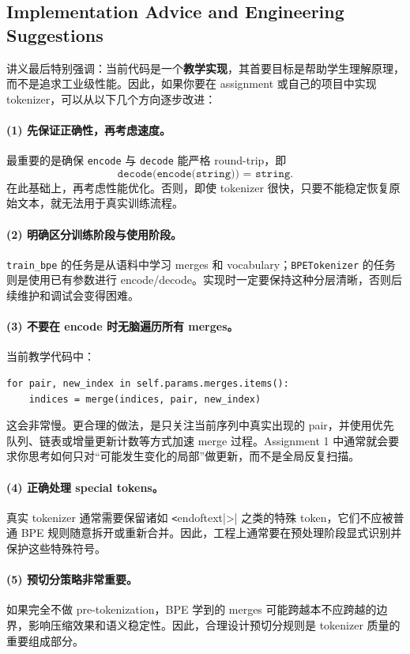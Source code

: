 \documentclass[a4paper,UTF8]{article}
\numberwithin{equation}{section}
\begin{document}
\subsection{Implementation Advice and Engineering Suggestions}

讲义最后特别强调：当前代码是一个\textbf{教学实现}，其首要目标是帮助学生理解原理，而不是追求工业级性能。因此，如果你要在 assignment 或自己的项目中实现 tokenizer，可以从以下几个方向逐步改进：

\paragraph{(1) 先保证正确性，再考虑速度。}
最重要的是确保 \verb|encode| 与 \verb|decode| 能严格 round-trip，即
\[
\texttt{decode(encode(string)) = string}.
\]
在此基础上，再考虑性能优化。否则，即使 tokenizer 很快，只要不能稳定恢复原始文本，就无法用于真实训练流程。

\paragraph{(2) 明确区分训练阶段与使用阶段。}
\verb|train_bpe| 的任务是从语料中学习 merges 和 vocabulary；\verb|BPETokenizer| 的任务则是使用已有参数进行 encode/decode。实现时一定要保持这种分层清晰，否则后续维护和调试会变得困难。

\paragraph{(3) 不要在 encode 时无脑遍历所有 merges。}
当前教学代码中：

\begin{verbatim}
for pair, new_index in self.params.merges.items():
    indices = merge(indices, pair, new_index)
\end{verbatim}

这会非常慢。更合理的做法，是只关注当前序列中真实出现的 pair，并使用优先队列、链表或增量更新计数等方式加速 merge 过程。Assignment 1 中通常就会要求你思考如何只对“可能发生变化的局部”做更新，而不是全局反复扫描。

\paragraph{(4) 正确处理 special tokens。}
真实 tokenizer 通常需要保留诸如 \verb|<|endoftext|>| 之类的特殊 token，它们不应被普通 BPE 规则随意拆开或重新合并。因此，工程上通常要在预处理阶段显式识别并保护这些特殊符号。

\paragraph{(5) 预切分策略非常重要。}
如果完全不做 pre-tokenization，BPE 学到的 merges 可能跨越本不应跨越的边界，影响压缩效果和语义稳定性。因此，合理设计预切分规则是 tokenizer 质量的重要组成部分。
\end{document}
